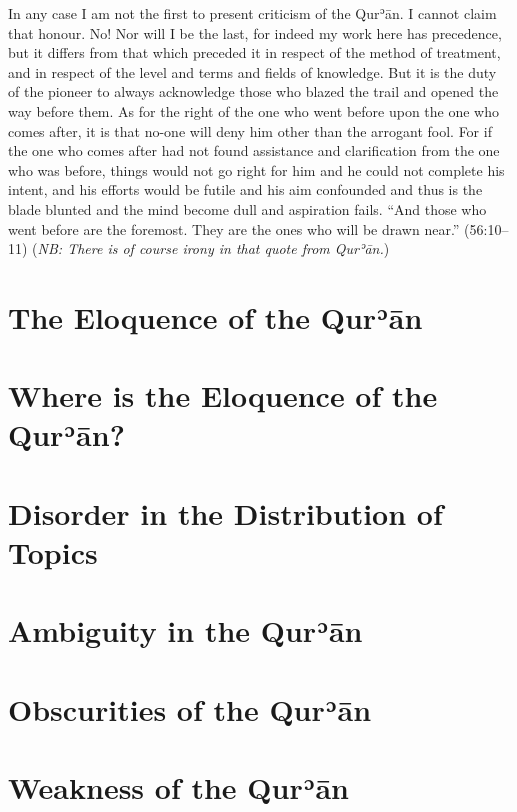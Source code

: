 \documentclass[12pt]{book}
\def \Quran{Qurʾān} %
\newcommand{\NB}[1]{\emph{NB: #1}}
\begin{document}

In any case I am not the first to present criticism of the \Quran.
I cannot claim that honour.
No! Nor will I be the last, for indeed my work here has precedence,
but it differs from that which preceded it in
respect of the method of treatment,
and in respect of the level and terms and fields of knowledge.
But it is the duty of the pioneer to always acknowledge those
who blazed the trail and opened the way before them.
As for the right of the one who went before upon the one who comes after,
it is that no-one will deny him other than the arrogant fool.
For if the one who comes after had not found assistance and
clarification from the one who was before,
things would not go right for him and he could not complete his intent,
and his efforts would be futile and his aim confounded and
thus is the blade blunted and the mind become dull and aspiration fails.
“And those who went before are the foremost.
They are the ones who will be drawn near.” (56:10–11)
(\NB{There is of course irony in that quote from \Quran.})

\section{The Eloquence of the \Quran}

\section{Where is the Eloquence of the \Quran?}

\section{Disorder in the Distribution of Topics}

\section{Ambiguity in the \Quran}

\section{Obscurities of the \Quran}

\section{Weakness of the \Quran}
\end{document}
